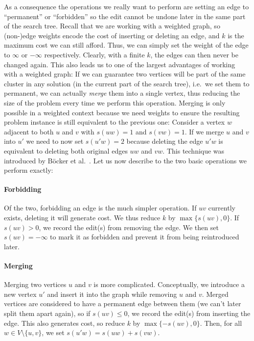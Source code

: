 \documentclass[12pt,oneside,english,parskip=full,headings=small]{scrbook}
\theoremstyle{definition}
\begin{document}
As a consequence the operations we really want to perform are setting an edge to ``permanent'' or
``forbidden'' so the edit cannot be undone later in the same part of the search tree. Recall that we
are working with a weighted graph, so (non-)edge weights encode the cost of inserting or deleting an
edge, and $k$ is the maximum cost we can still afford. Thus, we can simply set the weight of the
edge to $\infty$ or $-\infty$ respectively. Clearly, with a finite $k$, the edges can then never be
changed again. This also leads us to one of the largest advantages of working with a weighted graph:
If we can guarantee two vertices will be part of the same cluster in any solution (in the current
part of the search tree), i.e.\ we set them to permanent, we can actually \emph{merge} them into a
single vertex, thus reducing the size of the problem every time we perform this operation. Merging
is only possible in a weighted context because we need weights to ensure the resulting problem
instance is still equivalent to the previous one: Consider a vertex $w$ adjacent to both $u$ and $v$
with $s(uw) = 1$ and $s(vw) = 1$. If we merge $u$ and $v$ into $u'$ we need to now set $s(u'w) = 2$
because deleting the edge $u'w$ is equivalent to deleting both original edges $uw$ and $vw$. This
technique was introduced by Böcker et al.~\cite{AnApproach}. Let us now describe to the two basic
operations we perform exactly:

\paragraph{Forbidding} Of the two, forbidding an edge is the much simpler operation. If $uv$
currently exists, deleting it will generate cost. We thus reduce $k$ by $\max\{s(uv), 0\}$. If $s(uv)
> 0$, we record the edit(s) from removing the edge. We then set $s(uv) = -\infty$ to mark it as
forbidden and prevent it from being reintroduced later.

\paragraph{Merging} \label{sec:merging} Merging two vertices $u$ and $v$ is more complicated.
Conceptually, we introduce a new vertex $u'$ and insert it into the graph while removing $u$ and
$v$. Merged vertices are considered to have a permanent edge between them (we can't later split them
apart again), so if $s(uv) \leq 0$, we record the edit(s) from inserting the edge. This also
generates cost, so reduce $k$ by $\max\{-s(uv), 0\}$. Then, for all $w \in V \setminus \{u, v\}$, we
set $s(u'w) = s(uw) + s(vw)$.
\end{document}
